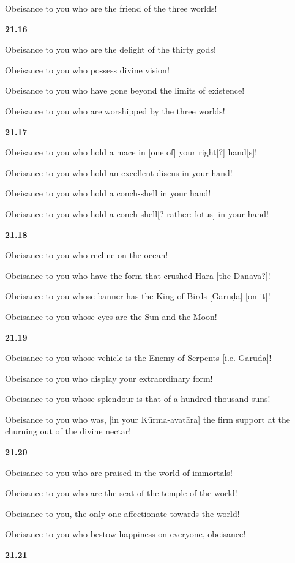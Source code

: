 \documentclass[12pt]{article} %
\begin{document}
      Obeisance to you who are the friend of the three worlds! 

\textbf{21.16}

 Obeisance to you who are the delight of the thirty gods! 

      Obeisance to you who possess divine vision! 

      Obeisance to you who have gone beyond the limits of existence! 

      Obeisance to you who are worshipped by the three worlds! 

\textbf{21.17}

 Obeisance to you who hold a mace in [one of] your right[?] hand[s]! 

      Obeisance to you who hold an excellent discus in your hand! 

      Obeisance to you who hold a conch-shell in your hand! 

      Obeisance to you who hold a conch-shell[? rather: lotus] in your hand! 

\textbf{21.18}

 Obeisance to you who recline on the ocean! 

      Obeisance to you who have the form that crushed Hara [the Dānava?]! 

      Obeisance to you whose banner has the King of Birds [Garuḍa] [on it]! 

      Obeisance to you whose eyes are the Sun and the Moon! 

\textbf{21.19}

 Obeisance to you whose vehicle is the Enemy of Serpents [i.e. Garuḍa]! 

      Obeisance to you who display your extraordinary form! 

      Obeisance to you whose splendour is that of a hundred thousand suns! 

      Obeisance to you who was, [in your Kūrma-avatāra] the firm support at the 
      churning out of the divine nectar! 

\textbf{21.20}

 Obeisance to you who are praised in the world of immortals! 

      Obeisance to you who are the seat of the temple of the world! 

      Obeisance to you, the only one affectionate towards the world! 

      Obeisance to you who bestow happiness on everyone, obeisance! 

\textbf{21.21}
\end{document}
